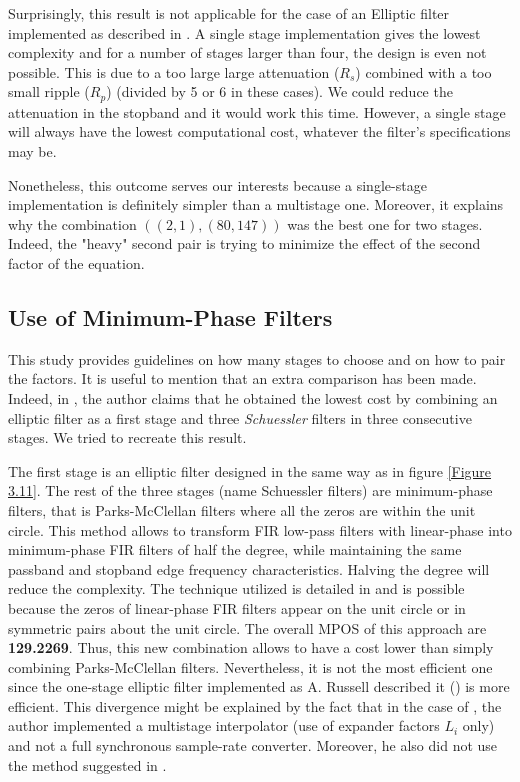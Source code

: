 Surprisingly, this result is not applicable for the case of an Elliptic filter implemented as described in \cite{russell}. A single stage implementation gives the lowest complexity and for a number of stages larger than four, the design is even not possible. This is due to a too large large attenuation ($R_s$) combined with a too small ripple ($R_p$) (divided by 5 or 6 in these cases). We could reduce the attenuation in the stopband and it would work this time. However, a single stage will always have the lowest computational cost, whatever the filter's specifications may be.

 Nonetheless, this outcome serves our interests because a single-stage implementation is definitely simpler than a multistage one. Moreover, it explains why the combination $((2,1),(80,147))$ was the best one for two stages. Indeed, the "heavy" second pair is trying to minimize the effect of the second factor of the equation.


\subsection{Use of Minimum-Phase Filters}

This study provides guidelines on how many stages to choose and on how to pair the factors. It is useful to mention that an extra comparison has been made. Indeed, in \cite{turek}, the author claims that he obtained the lowest cost by combining an elliptic filter as a first stage and three \textit{Schuessler} filters in three consecutive stages. We tried to recreate this result. 

The first stage is an elliptic filter designed in the same way as in figure \ref{Figure 3.11}. The rest of the three stages (name Schuessler filters) are minimum-phase filters, that is Parks-McClellan filters where all the zeros are within the unit circle. This method allows to transform FIR low-pass filters with linear-phase into minimum-phase FIR filters of half the degree, while maintaining the same passband and stopband edge frequency characteristics. Halving the degree will reduce the complexity. The technique utilized is detailed in \cite{turek} and is possible because the zeros of linear-phase FIR filters appear on the unit circle or in symmetric pairs about the unit circle. The overall MPOS of this approach are \textbf{129.2269}. Thus, this new combination allows to have a cost lower than simply combining Parks-McClellan filters. Nevertheless, it is not the most efficient one since the one-stage elliptic filter implemented as A. Russell described it (\cite{russell}) is more efficient. This divergence might be explained by the fact that in the case of \cite{turek}, the author implemented a multistage interpolator (use of expander factors $L_i$ only) and not a full synchronous sample-rate converter. Moreover, he also did not use the method suggested in \cite{russell}.


